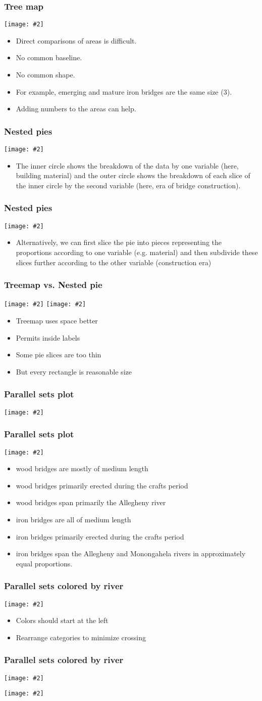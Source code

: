 \documentclass{beamer}
\newcommand{\bi}{\begin{itemize}}
\newcommand{\li}{\item}
\newcommand{\ei}{\end{itemize}}
\newcommand{\fig}[2]{\centerline{\texttt{[image: \#2]}}}
\newcommand{\figg}[2]{\texttt{[image: \#2]}}
\newcommand{\bfr}[1]{\begin{frame}[fragile]\frametitle{{ #1 }}}
\begin{document}
\bfr{Tree map}
\fig{.7}{bridges-treemap-1.png}\scriptsize
\bi
\li Direct comparisons of areas is difficult.
\li No common baseline.
\li No common shape.
\li For example, emerging and mature iron bridges are the same size (3).
\li Adding numbers to the areas can help.
\ei
\end{frame}

\bfr{Nested pies}
\fig{.7}{bridges-nested-pie-1.png}
\bi
\li The inner circle shows the breakdown of the data by one variable (here, building material) and the outer circle shows the breakdown of each slice of the inner circle by the second variable (here, era of bridge construction).
\ei

\end{frame}
\bfr{Nested pies}
\fig{.7}{bridges-nested-pie2-1.png}
\bi
\li Alternatively, we can first slice the pie into pieces representing the proportions according to one variable (e.g. material) and then subdivide these slices further according to the other variable (construction era)
\ei

\end{frame}

\bfr{Treemap vs. Nested pie}


\figg{.5}{bridges-treemap-1.png}%
\figg{.5}{bridges-nested-pie2-1.png}

\bi
\li  Treemap uses space better
\li Permits inside labels
\li Some pie slices are too thin
\li But every rectangle is reasonable size
\ei

\end{frame}

\bfr{Parallel sets plot}
\fig{1}{bridges-parallel-sets1-1.png}
\end{frame}

\bfr{Parallel sets plot}
\fig{.8}{bridges-parallel-sets1-1.png}\scriptsize
\bi
\li wood bridges are mostly of medium length 
\li wood bridges primarily erected during the crafts period
\li wood bridges span primarily the Allegheny river
\li iron bridges are all of medium length
\li iron bridges primarily erected during the crafts period
\li iron bridges span the Allegheny and Monongahela rivers in approximately equal proportions.
\ei
\end{frame}

\bfr{Parallel sets colored by river}
\fig{1}{bridges-parallel-sets2-1.png}
\bi
\li Colors should start at the left
\li Rearrange categories to minimize crossing
\ei
\end{frame}


\bfr{Parallel sets colored by river}
\fig{1}{bridges-parallel-sets3-1.png}
\end{frame}

\begin{frame}
\fig{.7}{0d9a779082f66a35443be831b31eb600}
\end{frame}
\end{document}
